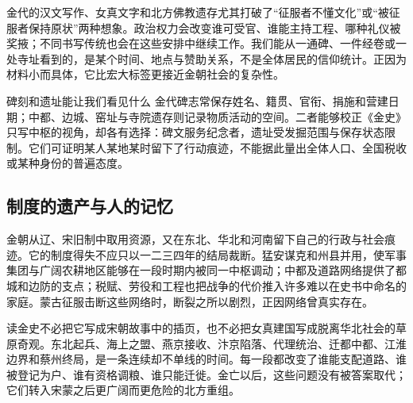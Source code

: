 金代的汉文写作、女真文字和北方佛教遗存尤其打破了“征服者不懂文化”或“被征服者保持原状”两种想象。政治权力会改变谁可受官、谁能主持工程、哪种礼仪被奖掖；不同书写传统也会在这些安排中继续工作。我们能从一通碑、一件经卷或一处寺址看到的，是某个时间、地点与赞助关系，不是全体居民的信仰统计。正因为材料小而具体，它比宏大标签更接近金朝社会的复杂性。

\begin{textwindow}{碑刻和遗址能让我们看见什么}
金代碑志常保存姓名、籍贯、官衔、捐施和营建日期；中都、边城、窑址与寺院遗存则记录物质活动的空间。二者能够校正《金史》只写中枢的视角，却各有选择：碑文服务纪念者，遗址受发掘范围与保存状态限制。它们可证明某人某地某时留下了行动痕迹，不能据此量出全体人口、全国税收或某种身份的普遍态度。
\end{textwindow}

\subsection{制度的遗产与人的记忆}

金朝从辽、宋旧制中取用资源，又在东北、华北和河南留下自己的行政与社会痕迹。它的制度得失不应只以一二三四年的结局裁断。猛安谋克和州县并用，使军事集团与广阔农耕地区能够在一段时期内被同一中枢调动；中都及道路网络提供了都城和边防的支点；税赋、劳役和工程也把战争的代价推入许多难以在史书中命名的家庭。蒙古征服击断这些网络时，断裂之所以剧烈，正因网络曾真实存在。

读金史不必把它写成宋朝故事中的插页，也不必把女真建国写成脱离华北社会的草原奇观。东北起兵、海上之盟、燕京接收、汴京陷落、代理统治、迁都中都、江淮边界和蔡州终局，是一条连续却不单线的时间。每一段都改变了谁能支配道路、谁被登记为户、谁有资格调粮、谁只能迁徙。金亡以后，这些问题没有被答案取代；它们转入宋蒙之后更广阔而更危险的北方重组。
